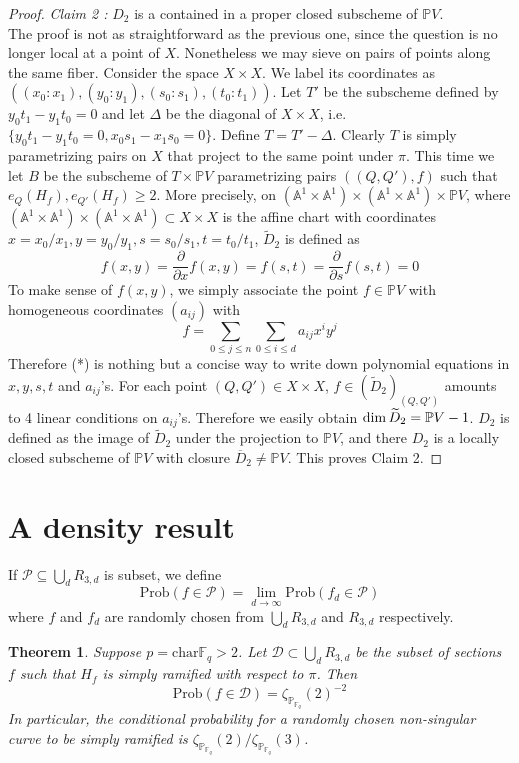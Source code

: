 \documentclass[12pt]{article}
\theoremstyle{plain}
\newtheorem{theorem}[equation]{Theorem}
\theoremstyle{definition}
\newcommand{\IA}{\mathbb{A}}
\newcommand{\IF}{\mathbb{F}}
\newcommand{\IP}{\mathbb{P}}
\newcommand{\sD}{\mathcal{D}}
\newcommand{\sP}{\mathcal{P}}
\renewcommand\dim{{\rm dim\,}}
\newcommand\union{\bigcup}
\newcommand{\<}{\langle}
\renewcommand{\>}{\rangle}
\def\wt{\widetilde}
\newcommand{\p}{\partial}
\newcommand{\Prob}{\mathrm{Prob}}
\begin{document}
\begin{proof}
\textit{Claim 2 :} $D_2$ is a contained in a proper closed subscheme of $\IP V$. \\
The proof is not as straightforward as the previous one, since the question is no longer local at a point of $X$. Nonetheless we may sieve on pairs of points along the same fiber. Consider the space $ X \times X$. We label its coordinates as $((x_0 : x_1), (y_0 : y_1), (s_0 : s_1), (t_0 : t_1))$. Let $T'$ be the subscheme defined by $y_0 t_1 - y_1 t_0 = 0$ and let $\Delta$ be the diagonal of $ X \times X$, i.e. $\{y_0 t_1 - y_1 t_0 = 0, x_0 s_1 - x_1 s_0 = 0 \}$. Define $T = T' - \Delta$. Clearly $T$ is simply parametrizing pairs on $X$ that project to the same point under $\pi$. This time we let $B$ be the subscheme of $ T \times \IP V$ parametrizing pairs $((Q, Q'), f)$ such that $e_Q(H_f),  e_{Q'}(H_f) \ge 2$. More precisely, on $(\IA^1 \times \IA^1) \times (\IA^1 \times \IA^1) \times \IP V$, where 
$(\IA^1 \times \IA^1) \times (\IA^1 \times \IA^1) \subset X \times X$ is the affine chart with coordinates $x= x_0/x_1, y = y_0/y_1, s = s_0/s_1, t = t_0/t_1$, $\wt{D}_2$ is defined as 
\begin{equation}\tag{*} f(x , y) = \frac{\p}{\p x}f(x, y) = f(s, t) = \frac{\p}{\p s}f(s, t) = 0 \end{equation}
To make sense of $f(x, y)$, we simply associate the point $f \in \IP V$ with homogeneous coordinates $(a_{ij})$ with $$ f = \sum_{0 \le j \le n} \sum_{0 \le i \le d} a_{ij} x^i y^j $$
Therefore (*) is nothing but a concise way to write down polynomial equations in $x, y, s, t$ and $a_{ij}$'s. For each point $(Q, Q') \in X \times X$, $f \in (\wt{D}_2)_{(Q, Q')}$ amounts to 4 linear conditions on $a_{ij}$'s. Therefore we easily obtain $\dim \wt{D}_2 = \IP V - 1$. $D_2$ is defined as the image of $\wt{D}_2$ under the projection to $\IP V$, and there $D_2$ is a locally closed subscheme of $\IP V$ with closure $\overline{D}_2 \neq \IP V$. This proves Claim 2. 


\end{proof}

\section{A density result}
If $\sP \subseteq \union_d R_{3, d}$ is subset, we define 
$$ \Prob(f \in \sP) = \lim_{d \to \infty}\Prob(f_d \in \sP) $$
where $f$ and $f_d$ are randomly chosen from $\union_{d} R_{3, d}$ and $R_{3, d}$ respectively. 
\begin{theorem}
\label{main}
Suppose $p = \mathrm{char } \IF_q > 2$. Let $\sD \subset \union_d R_{3,d}$ be the subset of sections $f$ such that $H_f$ is simply ramified with respect to $\pi$. Then
$$ \Prob(f \in \sD) = \zeta_{\IP_{\IF_q}}(2)^{-2} $$ In particular, the conditional probability for a randomly chosen non-singular curve to be simply ramified is $\zeta_{\IP_{\IF_q}}(2)/\zeta_{\IP_{\IF_q}}(3)$. 
\end{theorem}
\end{document}
